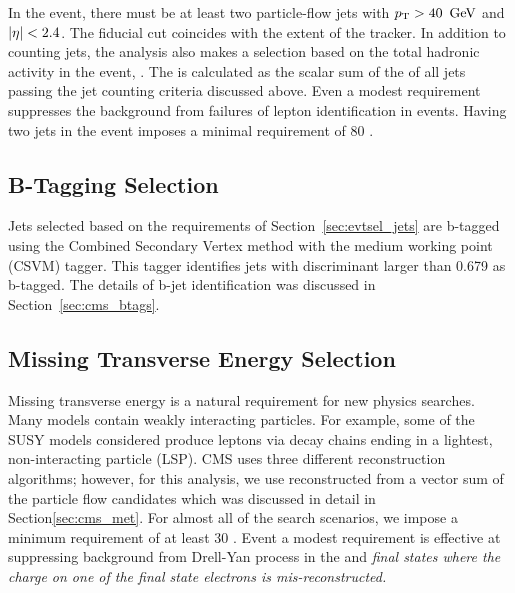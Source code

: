 In the event, there must be at least two particle-flow jets with $p_{\mathrm{T}} > 40\
\,\text{Ge\hspace{-.08em}V}$ and $\left|\eta\right| < 2.4$. The fiducial cut coincides with the extent of the
tracker. In addition to counting jets, the analysis also makes a selection
based on the total hadronic activity in the event, \Ht. The \Ht is calculated
as the scalar sum of the \pt of all jets passing the jet counting criteria
discussed above. Even a modest \Ht requirement suppresses the background from
failures of lepton identification in \Wj events. Having two jets in the event
imposes a minimal \Ht requirement of 80 \GeV.

\subsection{B-Tagging Selection}
\label{sec:evtsel_btag}
Jets selected based on the requirements of Section~\ref{sec:evtsel_jets} are
b-tagged using the Combined Secondary Vertex method with the medium working
point (CSVM) tagger. This tagger identifies jets with discriminant larger
than 0.679 as b-tagged. The details of b-jet identification was discussed in
Section~\ref{sec:cms_btags}.

\subsection{Missing Transverse Energy Selection}
\label{sec:evtsel_met}
Missing transverse energy is a natural requirement for new physics searches.
Many models contain weakly interacting particles. For example, some of the
SUSY models considered produce leptons via decay chains ending in a lightest,
non-interacting particle (LSP). CMS uses three different \met reconstruction
algorithms; however, for this analysis, we use \met reconstructed from a
vector sum of the particle flow candidates which was discussed in detail in
Section\ref{sec:cms_met}. For almost all of the search scenarios, we impose a
minimum \met requirement of at least 30 \GeV. Event a modest \met requirement
is effective at suppressing background from Drell-Yan process in the \ee and
\em final states where the charge on one of the final state electrons is
mis-reconstructed.


